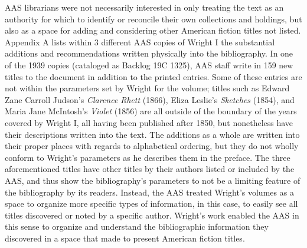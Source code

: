 AAS librarians were not necessarily interested in only treating the text as an authority for which to identify or reconcile their own collections and holdings, but also as a space for adding and considering other American fiction titles not listed. Appendix A lists within 3 different AAS copies of Wright I the substantial additions and recommendations written physically into the bibliography. In one of the 1939 copies (cataloged as Backlog 19C 1325), AAS staff write in 159 new titles to the document in addition to the printed entries. Some of these entries are not within the parameters set by Wright for the volume; titles such as Edward Zane Carroll Judson's \textit{Clarence Rhett} (1866), Eliza Leslie's \textit{Sketches} (1854), and Maria Jane McIntosh's \textit{Violet} (1856) are all outside of the boundary of the years covered by Wright I, all having been published after 1850, but nonetheless have their descriptions written into the text. The additions as a whole are written into their proper places with regards to alphabetical ordering, but they do not wholly conform to Wright's parameters as he describes them in the preface. The three aforementioned titles have other titles by their authors listed or included by the AAS, and thus show the bibliography's parameters to not be a limiting feature of the bibliography by its readers. Instead, the AAS treated Wright's volumes as a space to organize more specific types of information, in this case, to easily see all titles discovered or noted by a specific author. Wright's work enabled the AAS in this sense to organize and understand the bibliographic information they discovered in a space that made to present American fiction titles. 

